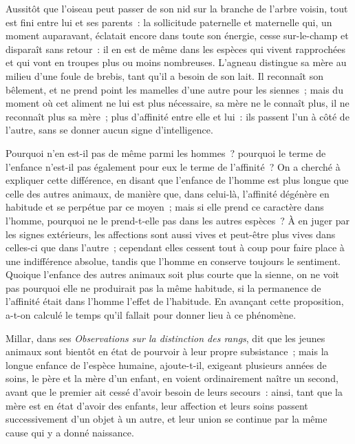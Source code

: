 \documentclass[french,twoside]{book} %
\newcommand\chaptercont{} %
\begin{document}
\chaptercont
\noindent Aussitôt que l’oiseau peut passer de son nid sur la branche de l’arbre voisin, tout est fini entre lui et ses parents : la sollicitude paternelle et maternelle qui, un moment auparavant, éclatait encore dans toute son énergie, cesse sur-le-champ et disparaît sans retour : il en est de même dans les espèces qui vivent rapprochées et qui vont en troupes plus ou moins nombreuses. L’agneau distingue sa mère au milieu d’une foule de brebis, tant qu’il a besoin de son lait. Il reconnaît son bêlement, et ne prend point les mamelles d’une autre pour les siennes ; mais du moment où cet aliment ne lui est plus nécessaire, sa mère ne le connaît plus, il ne reconnaît plus sa mère ; plus d’affinité entre elle et lui : ils passent l’un à côté de l’autre, sans se donner aucun signe d’intelligence.\par
Pourquoi n’en est-il pas de même parmi les hommes ? pourquoi le terme de l’enfance n’est-il pas également pour eux le terme de l’affinité ? On a cherché à expliquer cette différence, en disant que l’enfance de l’homme est plus longue que celle des autres animaux, de manière que, dans celui-là, l’affinité dégénère en habitude et se perpétue par ce moyen ; mais si elle prend ce caractère dans l’homme, pourquoi ne le prend-t-elle pas dans les autres espèces ? À en juger par les signes extérieurs, les affections sont aussi vives et peut-être plus vives dans celles-ci que dans l’autre ; cependant elles cessent tout à coup pour faire place à une indifférence absolue, tandis que l’homme en conserve toujours le sentiment. Quoique l’enfance des autres animaux soit plus courte que la sienne, on ne voit pas pourquoi elle ne produirait pas la même habitude, si la permanence de l’affinité était dans l’homme l’effet de l’habitude. En avançant cette proposition, a-t-on calculé le temps qu’il fallait pour donner lieu à ce phénomène.\par
Millar, dans ses {\itshape Observations sur la distinction des rangs}, dit que les jeunes animaux sont bientôt en état de pourvoir à leur propre subsistance ; mais la longue enfance de l’espèce humaine, ajoute-t-il, exigeant plusieurs années de soins, le père et la mère d’un enfant, en voient ordinairement naître un second, avant que le premier ait cessé d’avoir besoin de leurs secours : ainsi, tant que la mère est en état d’avoir des enfants, leur affection et leurs soins passent successivement d’un objet à un autre, et leur union se continue par la même cause qui y a donné naissance.\par
\end{document}
